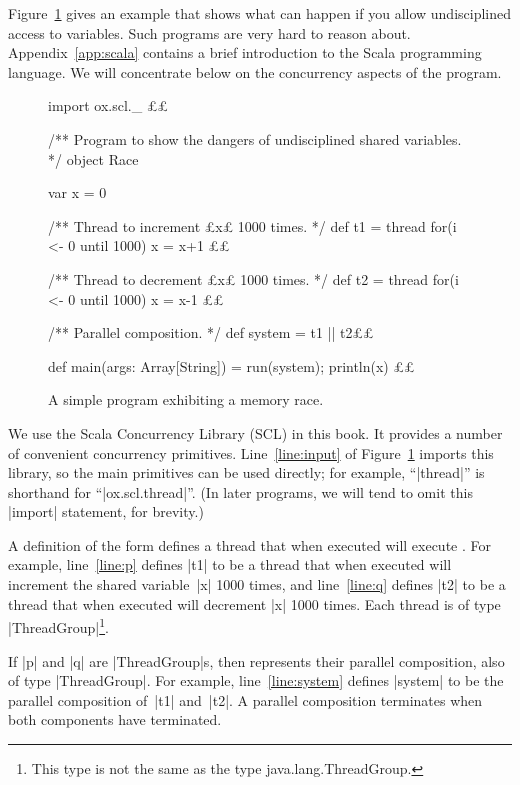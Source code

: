 Figure~\ref{fig:race} gives an example that shows what can happen if you allow
undisciplined access to variables.  Such programs are very hard to reason
about.
Appendix~\ref{app:scala} contains a brief introduction to the Scala
programming language.  We will concentrate below on the concurrency aspects of
the program. 


\begin{figure}
\begin{scala}[numbers = left]
import ox.scl._  £\label{line:input}£

/** Program to show the dangers of undisciplined shared variables. */
object Race{
  var x = 0

  /** Thread to increment £x£ 1000 times. */
  def t1 = thread{ for(i <- 0 until 1000) x = x+1 }£\label{line:p}£

  /** Thread to decrement £x£ 1000 times. */
  def t2 = thread{ for(i <- 0 until 1000) x = x-1 }£\label{line:q}£

  /** Parallel composition. */
  def system = t1 || t2£\label{line:system}£

  def main(args: Array[String]) = { run(system); println(x) }£\label{line:main}£
}
\end{scala}%
\caption{A simple program exhibiting a memory race.}
\label{fig:race}
\end{figure}



We use the Scala Concurrency Library (SCL) in this book.  It provides a number
of convenient concurrency primitives.  Line~\ref{line:input} of
Figure~\ref{fig:race} imports this library, so the main primitives can be used
directly; for example, ``|thread|'' is shorthand for ``|ox.scl.thread|''.  (In
later programs, we will tend to omit this |import| statement, for brevity.)

A definition of the form  defines a thread that when
executed will execute .  For example, line~\ref{line:p} defines
|t1| to be a thread that when executed will increment the shared variable~|x|
1000 times, and line~\ref{line:q} defines |t2| to be a thread that when
executed will decrement |x| 1000 times.  Each thread is of type
|ThreadGroup|\footnote{This type is not the same as the type {\scalashape
    java.lang.ThreadGroup}.}.

If |p| and |q| are |ThreadGroup|s, then  represents their
parallel composition, also of type |ThreadGroup|.  For example,
line~\ref{line:system} defines |system| to be the parallel composition of~|t1|
and~|t2|.  A parallel composition terminates when both components have
terminated.

